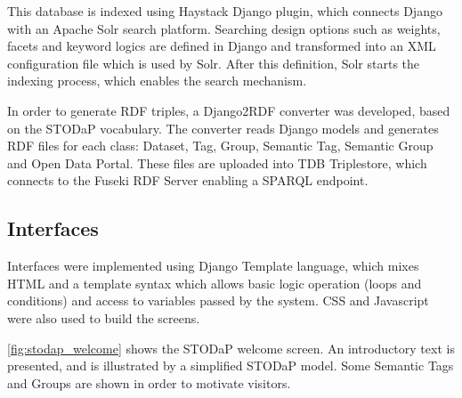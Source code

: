 This database is indexed using Haystack Django plugin, which connects Django with an Apache Solr search platform.
Searching design options such as weights, facets and keyword logics are defined in Django and transformed into an XML configuration file which is used by Solr.
After this definition, Solr starts the indexing process, which enables the search mechanism.

In order to generate RDF triples, a Django2RDF converter was developed, based on the STODaP vocabulary.
The converter reads Django models and generates RDF files for each class: Dataset, Tag, Group, Semantic Tag, Semantic Group and Open Data Portal.
These files are uploaded into TDB Triplestore, which connects to the Fuseki RDF Server enabling a SPARQL endpoint.



	

\subsection{Interfaces}
\label{sec:implem_interface}

Interfaces were implemented using Django Template language, which mixes HTML and a template syntax which allows basic logic operation (loops and conditions) and access to variables passed by the system.
CSS and Javascript were also used to build the screens.

\autoref{fig:stodap_welcome} shows the STODaP welcome screen.
An introductory text is presented, and is illustrated by a simplified STODaP model.
Some Semantic Tags and Groups are shown in order to motivate visitors.

